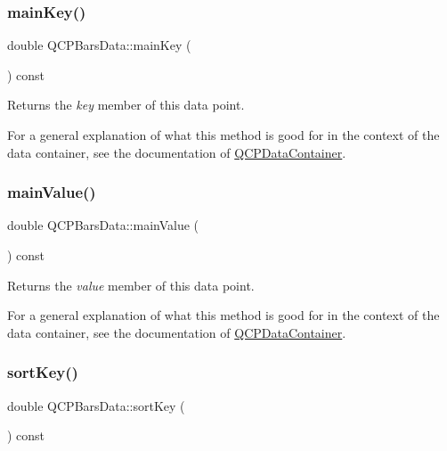 \subsubsection{\texorpdfstring{main\+Key()}{mainKey()}}
{\footnotesize\ttfamily double Q\+C\+P\+Bars\+Data\+::main\+Key (\begin{DoxyParamCaption}{ }\end{DoxyParamCaption}) const\hspace{0.3cm}{\ttfamily [inline]}}

Returns the {\itshape key} member of this data point.

For a general explanation of what this method is good for in the context of the data container, see the documentation of \hyperlink{class_q_c_p_data_container}{Q\+C\+P\+Data\+Container}. \mbox{\label{class_q_c_p_bars_data_a360d975e587f9e84259aaec172efb10b}} 
\subsubsection{\texorpdfstring{main\+Value()}{mainValue()}}
{\footnotesize\ttfamily double Q\+C\+P\+Bars\+Data\+::main\+Value (\begin{DoxyParamCaption}{ }\end{DoxyParamCaption}) const\hspace{0.3cm}{\ttfamily [inline]}}

Returns the {\itshape value} member of this data point.

For a general explanation of what this method is good for in the context of the data container, see the documentation of \hyperlink{class_q_c_p_data_container}{Q\+C\+P\+Data\+Container}. \mbox{\label{class_q_c_p_bars_data_a107d22d84f336bf6e3c3ad0133a5d2f6}} 
\subsubsection{\texorpdfstring{sort\+Key()}{sortKey()}}
{\footnotesize\ttfamily double Q\+C\+P\+Bars\+Data\+::sort\+Key (\begin{DoxyParamCaption}{ }\end{DoxyParamCaption}) const\hspace{0.3cm}{\ttfamily [inline]}}

